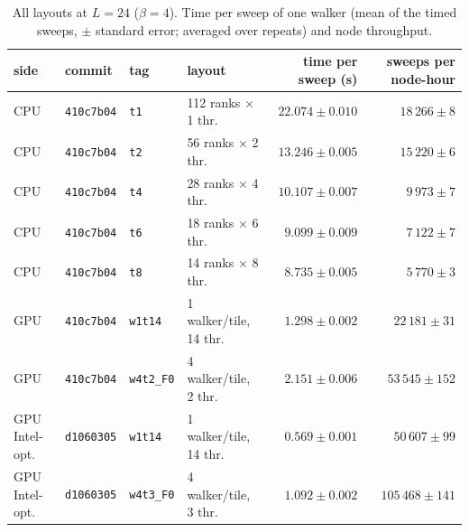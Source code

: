 \begin{table}[h]\centering\small
\caption{All layouts at $L=24$ ($\beta=4$). Time per sweep of one walker (mean of the timed sweeps, $\pm$ standard error; averaged over repeats) and node throughput.}
\begin{tabular}{@{}llllrr@{}}\toprule
side & commit & tag & layout & time per sweep (s) & sweeps per node-hour\\\midrule
CPU & \texttt{410c7b04} & \texttt{t1} & 112 ranks $\times$ 1 thr. & $22.074 \pm 0.010$ & $18\,266 \pm 8$\\
CPU & \texttt{410c7b04} & \texttt{t2} & 56 ranks $\times$ 2 thr. & $13.246 \pm 0.005$ & $15\,220 \pm 6$\\
CPU & \texttt{410c7b04} & \texttt{t4} & 28 ranks $\times$ 4 thr. & $10.107 \pm 0.007$ & $9\,973 \pm 7$\\
CPU & \texttt{410c7b04} & \texttt{t6} & 18 ranks $\times$ 6 thr. & $9.099 \pm 0.009$ & $7\,122 \pm 7$\\
CPU & \texttt{410c7b04} & \texttt{t8} & 14 ranks $\times$ 8 thr. & $8.735 \pm 0.005$ & $5\,770 \pm 3$\\
GPU & \texttt{410c7b04} & \texttt{w1t14} & 1 walker/tile, 14 thr. & $1.298 \pm 0.002$ & $22\,181 \pm 31$\\
GPU & \texttt{410c7b04} & \texttt{w4t2\_F0} & 4 walker/tile, 2 thr. & $2.151 \pm 0.006$ & $53\,545 \pm 152$\\
GPU Intel-opt. & \texttt{d1060305} & \texttt{w1t14} & 1 walker/tile, 14 thr. & $0.569 \pm 0.001$ & $50\,607 \pm 99$\\
GPU Intel-opt. & \texttt{d1060305} & \texttt{w4t3\_F0} & 4 walker/tile, 3 thr. & $1.092 \pm 0.002$ & $105\,468 \pm 141$\\
\bottomrule\end{tabular}\end{table}
